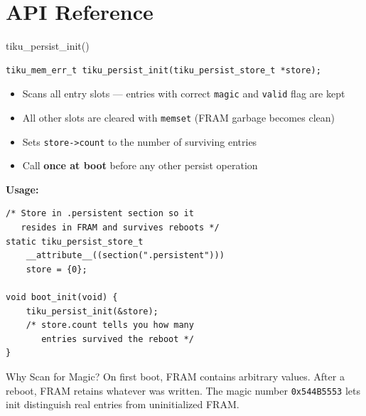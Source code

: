 \documentclass[aspectratio=169, 10pt]{beamer}
\begin{document}
\section{API Reference}

\begin{frame}[fragile]{tiku\_persist\_init()}
\begin{lstlisting}[style=cstyle]
tiku_mem_err_t tiku_persist_init(tiku_persist_store_t *store);
\end{lstlisting}

\begin{itemize}
  \item Scans all entry slots --- entries with correct \texttt{magic} and \texttt{valid} flag are kept
  \item All other slots are cleared with \texttt{memset} (FRAM garbage becomes clean)
  \item Sets \texttt{store->count} to the number of surviving entries
  \item Call \textbf{once at boot} before any other persist operation
\end{itemize}

\vspace{0.3em}
\textbf{Usage:}
\begin{lstlisting}[style=cstyle]
/* Store in .persistent section so it
   resides in FRAM and survives reboots */
static tiku_persist_store_t
    __attribute__((section(".persistent")))
    store = {0};

void boot_init(void) {
    tiku_persist_init(&store);
    /* store.count tells you how many
       entries survived the reboot */
}
\end{lstlisting}

\vspace{0.3em}
\begin{block}{Why Scan for Magic?}
On first boot, FRAM contains arbitrary values. After a reboot, FRAM retains
whatever was written. The magic number \texttt{0x544B5553} lets init
distinguish real entries from uninitialized FRAM.
\end{block}
\end{frame}
\end{document}
